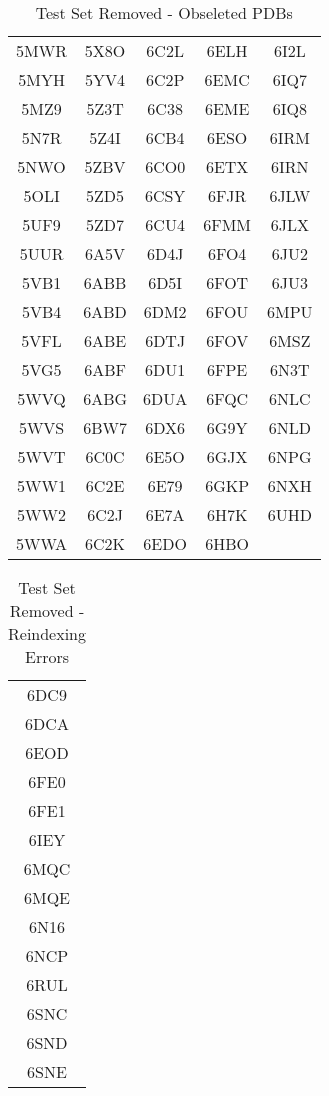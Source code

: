 \documentclass[journal=jacsat,manuscript=article]{achemso}
\begin{document}
\begin{center}
  \begin{table}[ht]
    \centering
    \begin{tabular}{|c c c c c|}
      \hline
      5MWR & 5X8O & 6C2L & 6ELH & 6I2L \\
      5MYH & 5YV4 & 6C2P & 6EMC & 6IQ7 \\
      5MZ9 & 5Z3T & 6C38 & 6EME & 6IQ8 \\
      5N7R & 5Z4I & 6CB4 & 6ESO & 6IRM \\
      5NWO & 5ZBV & 6CO0 & 6ETX & 6IRN \\
      5OLI & 5ZD5 & 6CSY & 6FJR & 6JLW \\
      5UF9 & 5ZD7 & 6CU4 & 6FMM & 6JLX \\
      5UUR & 6A5V & 6D4J & 6FO4 & 6JU2 \\
      5VB1 & 6ABB & 6D5I & 6FOT & 6JU3 \\
      5VB4 & 6ABD & 6DM2 & 6FOU & 6MPU \\
      5VFL & 6ABE & 6DTJ & 6FOV & 6MSZ \\
      5VG5 & 6ABF & 6DU1 & 6FPE & 6N3T \\
      5WVQ & 6ABG & 6DUA & 6FQC & 6NLC \\
      5WVS & 6BW7 & 6DX6 & 6G9Y & 6NLD \\
      5WVT & 6C0C & 6E5O & 6GJX & 6NPG \\
      5WW1 & 6C2E & 6E79 & 6GKP & 6NXH \\
      5WW2 & 6C2J & 6E7A & 6H7K & 6UHD \\
      5WWA & 6C2K & 6EDO & 6HBO &      \\
      \hline
    \end{tabular}
    \caption{Test Set Removed - Obseleted PDBs}
    \label{table:testobseleted}
  \end{table}
\end{center}
\clearpage

\begin{center}
  \begin{table}[ht]
    \centering
    \begin{tabular}{|c|}
      \hline
      6DC9 \\
      6DCA \\
      6EOD \\
      6FE0 \\
      6FE1 \\
      6IEY \\
      6MQC \\
      6MQE \\
      6N16 \\
      6NCP \\
      6RUL \\
      6SNC \\
      6SND \\
      6SNE \\
      \hline
    \end{tabular}
    \caption{Test Set Removed - Reindexing Errors}
    \label{table:testreindex}
  \end{table}
\end{center}
\clearpage
\end{document}
